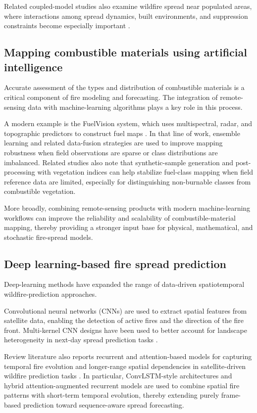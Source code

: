 \documentclass[10pt,letterpaper]{article}
\begin{document}
Related coupled-model studies also examine wildfire spread near
populated areas, where interactions among spread dynamics, built
environments, and suppression constraints become especially important
\cite{szasdi2025}.

\subsection*{Mapping combustible materials using artificial
intelligence}

Accurate assessment of the types and distribution of combustible
materials is a critical component of fire modeling and forecasting. The
integration of remote-sensing data with machine-learning algorithms
plays a key role in this process.

A modern example is the FuelVision system, which uses multispectral,
radar, and topographic predictors to construct fuel maps
\cite{shaik2025}. In that line of work, ensemble learning and related
data-fusion strategies are used to improve mapping robustness when
field observations are sparse or class distributions are imbalanced.
Related studies also note that synthetic-sample generation and
post-processing with vegetation indices can help stabilize fuel-class
mapping when field reference data are limited, especially for
distinguishing non-burnable classes from combustible vegetation.

More broadly, combining remote-sensing products with modern
machine-learning workflows can improve the reliability and scalability
of combustible-material mapping, thereby providing a stronger input base
for physical, mathematical, and stochastic fire-spread models.

\subsection*{Deep learning-based fire spread prediction}

Deep-learning methods have expanded the range of data-driven
spatiotemporal wildfire-prediction approaches.

Convolutional neural networks (CNNs) are used to extract spatial
features from satellite data, enabling the detection of active fires and
the direction of the fire front. Multi-kernel CNN designs have been
used to better account for landscape heterogeneity in next-day spread
prediction tasks \cite{marjani2023}.

Review literature also reports recurrent and attention-based models for
capturing temporal fire evolution and longer-range spatial dependencies
in satellite-driven wildfire prediction tasks \cite{andrianarivony2024}.
In particular, ConvLSTM-style architectures and hybrid
attention-augmented recurrent models are used to combine spatial fire
patterns with short-term temporal evolution, thereby extending purely
frame-based prediction toward sequence-aware spread forecasting.
\end{document}
